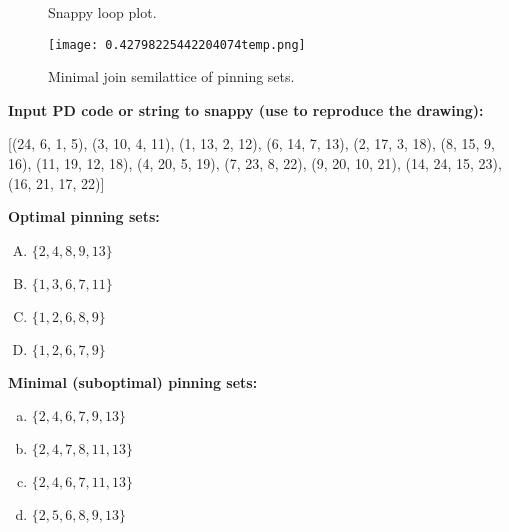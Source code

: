 \documentclass{article}%
\begin{document}
\begin{multicols}{2}
\begin{figure}[H]
\centering

\caption{Snappy loop plot.}
\label{fig:0.5911219283586102temp.svg}
\end{figure}\columnbreak

\begin{figure}[H]
\centering
\texttt{[image: 0.42798225442204074temp.png]}
\caption{Minimal join semilattice of pinning sets.}
\label{fig:0.42798225442204074temp.png}
\end{figure}\end{multicols}\newpage\begin{multicols}{2}

\columnbreak

\noindent\textbf{Input PD code or string to snappy (use to reproduce the drawing):}

	[(24, 6, 1, 5), (3, 10, 4, 11), (1, 13, 2, 12), (6, 14, 7, 13), (2, 17, 3, 18), (8, 15, 9, 16), (11, 19, 12, 18), (4, 20, 5, 19), (7, 23, 8, 22), (9, 20, 10, 21), (14, 24, 15, 23), (16, 21, 17, 22)]

\noindent\textbf{Optimal pinning sets:}

\begin{enumerate}[A)]
\item{\Huge\textcolor{red0}{\textbullet}}$\{2,4,8,9,13\}$

\item{\Huge\textcolor{red2}{\textbullet}}$\{1,3,6,7,11\}$

\item{\Huge\textcolor{red5}{\textbullet}}$\{1,2,6,8,9\}$

\item{\Huge\textcolor{red7}{\textbullet}}$\{1,2,6,7,9\}$

\end{enumerate}
\textbf{Minimal (suboptimal) pinning sets:}

\begin{enumerate}[a)]
\item{\Huge\textcolor{green0}{\textbullet}}$\{2,4,6,7,9,13\}$

\item{\Huge\textcolor{green1}{\textbullet}}$\{2,4,7,8,11,13\}$

\item{\Huge\textcolor{green2}{\textbullet}}$\{2,4,6,7,11,13\}$

\item{\Huge\textcolor{green3}{\textbullet}}$\{2,5,6,8,9,13\}$


\end{enumerate}
\end{multicols}
\end{document}

